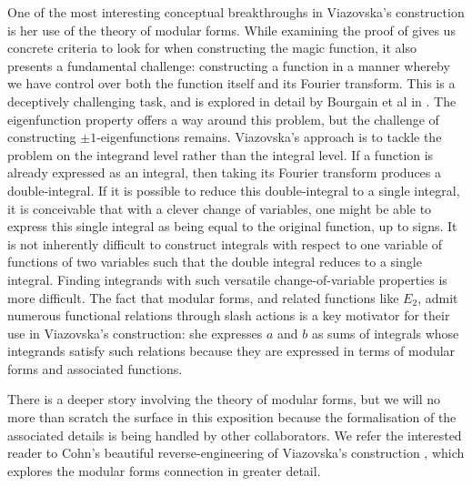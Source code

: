One of the most interesting conceptual breakthroughs in Viazovska's construction is her use of the theory of modular forms. While examining the proof of  gives us concrete criteria to look for when constructing the magic function, it also presents a fundamental challenge: constructing a function in a manner whereby we have control over both the function itself and its Fourier transform. This is a deceptively challenging task, and is explored in detail by Bourgain et al in \cite{UncertaintyPrincipleFR}. The eigenfunction property offers a way around this problem, but the challenge of constructing $\pm 1$-eigenfunctions remains. Viazovska's approach is to tackle the problem on the integrand level rather than the integral level. If a function is already expressed as an integral, then taking its Fourier transform produces a double-integral. If it is possible to reduce this double-integral to a single integral, it is conceivable that with a clever change of variables, one might be able to express this single integral as being equal to the original function, up to signs. It is not inherently difficult to construct integrals with respect to one variable of functions of two variables such that the double integral reduces to a single integral. Finding integrands with such versatile change-of-variable properties is more difficult. The fact that modular forms, and related functions like $E_2$, admit numerous functional relations through slash actions is a key motivator for their use in Viazovska's construction: she expresses $a$ and $b$ as sums of integrals whose integrands satisfy such relations because they are expressed in terms of modular forms and associated functions.

There is a deeper story involving the theory of modular forms, but we will no more than scratch the surface in this exposition because the formalisation of the associated details is being handled by other collaborators. We refer the interested reader to Cohn's beautiful reverse-engineering of Viazovska's construction \cite{CohnOnViazovskaICM}, which explores the modular forms connection in greater detail.

